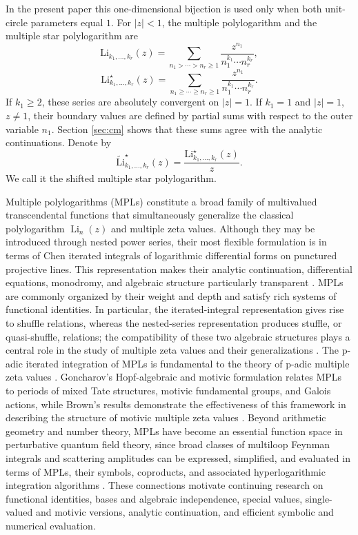 \documentclass[12pt,a4paper]{amsart}
\numberwithin{equation}{section}
\theoremstyle{plain}
\theoremstyle{definition}
\begin{document}
In the present paper this one-dimensional bijection is used only when both unit-circle parameters equal $1$. For $|z|<1$, the multiple polylogarithm and the multiple star polylogarithm are
\[
\mathrm{Li}_{k_1,\ldots,k_r}(z)=
\sum_{n_1>\cdots>n_r\geq 1}
\frac{z^{n_1}}{n_1^{k_1}\cdots n_r^{k_r}},
\]
\[
\mathrm{Li}^{\star}_{k_1,\ldots,k_r}(z)=
\sum_{n_1\geq\cdots\geq n_r\geq 1}
\frac{z^{n_1}}{n_1^{k_1}\cdots n_r^{k_r}}.
\]
If $k_1\geq 2$, these series are absolutely convergent on $|z|=1$.  If $k_1=1$ and $|z|=1$, $z\neq 1$, their boundary values are defined by partial sums with respect to the outer variable $n_1$. Section \ref{sec:cm} shows that these sums agree with the analytic continuations.  Denote by 
\[
\widetilde{\mathrm{Li}}^{\star}_{k_1,\ldots,k_r}(z)
=\frac{\mathrm{Li}^{\star}_{k_1,\ldots,k_r}(z)}{z}.
\]
We call it the shifted multiple star polylogarithm.

Multiple polylogarithms (MPLs) constitute a broad family of multivalued transcendental functions that simultaneously generalize the classical polylogarithm \(\operatorname{Li}_n(z)\) and multiple zeta values. Although they may be introduced through nested power series, their most flexible formulation is in terms of Chen iterated integrals of logarithmic differential forms on punctured projective lines. This representation makes their analytic continuation, differential equations, monodromy, and algebraic structure particularly transparent \cite{chen,gon1}. MPLs are commonly organized by their weight and depth and satisfy rich systems of functional identities. In particular, the iterated-integral representation gives rise to shuffle relations, whereas the nested-series representation produces stuffle, or quasi-shuffle, relations; the compatibility of these two algebraic structures plays a central role in the study of multiple zeta values and their generalizations \cite{fur,gon1,gon2}.  The p-adic iterated integration of MPLs is fundamental to the theory of p-adic multiple zeta values \cite{col,fur}.  Goncharov’s Hopf-algebraic and motivic formulation relates MPLs to periods of mixed Tate structures, motivic fundamental groups, and Galois actions, while Brown’s results demonstrate the effectiveness of this framework in describing the structure of motivic multiple zeta values \cite{brow,gon1,gon2}. Beyond arithmetic geometry and number theory, MPLs have become an essential function space in perturbative quantum field theory, since broad classes of multiloop Feynman integrals and scattering amplitudes can be expressed, simplified, and evaluated in terms of MPLs, their symbols, coproducts, and associated hyperlogarithmic integration algorithms \cite{bro1,duhr,pan}. These connections motivate continuing research on functional identities, bases and algebraic independence, special values, single-valued and motivic versions, analytic continuation, and efficient symbolic and numerical evaluation.
\end{document}
